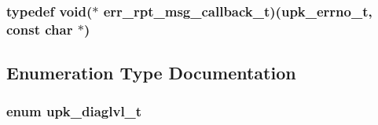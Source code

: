 \subsubsection[{err\_\-rpt\_\-msg\_\-callback\_\-t}]{\setlength{\rightskip}{0pt plus 5cm}typedef void($\ast$ {\bf err\_\-rpt\_\-msg\_\-callback\_\-t})({\bf upk\_\-errno\_\-t}, const char $\ast$)}\label{group__upk__errors_gaaacf9b7f9daf89c473706185f68ff493}


\subsection{Enumeration Type Documentation}
\subsubsection[{upk\_\-diaglvl\_\-t}]{\setlength{\rightskip}{0pt plus 5cm}enum {\bf upk\_\-diaglvl\_\-t}}\label{group__upk__errors_ga69a581dfd708ad2e18688e01cbcc0ff8}
